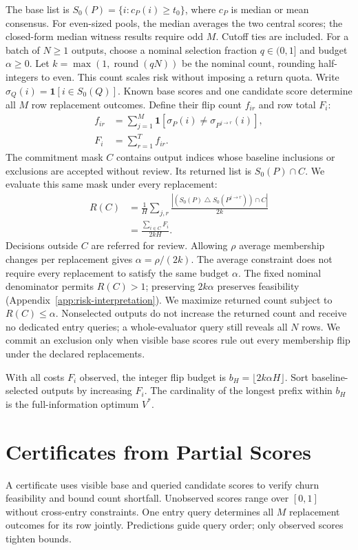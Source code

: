 \documentclass[11pt]{article}
\newcommand{\one}{\mathbf{1}}
\newcommand{\SD}{\mathbin{\triangle}}
\begin{document}
The base list is $S_0(P)=\{i:c_P(i)\ge t_0\}$, where $c_P$ is median or mean consensus. For even-sized pools, the median averages the two central scores; the closed-form median witness results require odd $M$. Cutoff ties are included. For a batch of $N\ge1$ outputs, choose a nominal selection fraction $q\in(0,1]$ and budget $\alpha\ge0$. Let $k=\max(1,\operatorname{round}(qN))$ be the nominal count, rounding half-integers to even. This count scales risk without imposing a return quota. Write $\sigma_Q(i)=\one[i\in S_0(Q)]$. Known base scores and one candidate score determine all $M$ row replacement outcomes. Define their flip count $f_{ir}$ and row total $F_i$:
\begin{align}
 f_{ir}&=\sum_{j=1}^{M}\one[\sigma_P(i)\ne\sigma_{P^{j\to r}}(i)],\nonumber\\
 F_i&=\sum_{r=1}^{T}f_{ir}.
 \label{eq:cost}
\end{align}
The commitment mask $C$ contains output indices whose baseline inclusions or exclusions are accepted without review. Its returned list is $S_0(P)\cap C$. We evaluate this same mask under every replacement:
\begin{align}
 R(C)&=\frac1H\sum_{j,r}\frac{|(S_0(P)\SD S_0(P^{j\to r}))\cap C|}{2k}\nonumber\\
 &=\frac{\sum_{i\in C}F_i}{2kH}.
 \label{eq:risk}
\end{align}
Decisions outside $C$ are referred for review. Allowing $\rho$ average membership changes per replacement gives $\alpha=\rho/(2k)$. The average constraint does not require every replacement to satisfy the same budget $\alpha$. The fixed nominal denominator permits $R(C)>1$; preserving $2k\alpha$ preserves feasibility (Appendix~\ref{app:risk-interpretation}). We maximize returned count subject to $R(C)\le\alpha$. Nonselected outputs do not increase the returned count and receive no dedicated entry queries; a whole-evaluator query still reveals all $N$ rows. We commit an exclusion only when visible base scores rule out every membership flip under the declared replacements.

With all costs $F_i$ observed, the integer flip budget is $b_H=\lfloor2k\alpha H\rfloor$. Sort baseline-selected outputs by increasing $F_i$. The cardinality of the longest prefix within $b_H$ is the full-information optimum $V^*$.

\section{Certificates from Partial Scores}
\label{sec:partial}
A certificate uses visible base and queried candidate scores to verify churn feasibility and bound count shortfall. Unobserved scores range over $[0,1]$ without cross-entry constraints. One entry query determines all $M$ replacement outcomes for its row jointly. Predictions guide query order; only observed scores tighten bounds.
\end{document}
